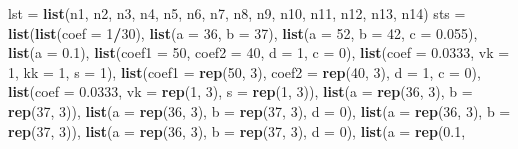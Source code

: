 \documentclass[
]{article}
\newenvironment{Shaded}{\begin{snugshade}}{\end{snugshade}}
\newcommand{\DataTypeTok}[1]{\textcolor[rgb]{0.13,0.29,0.53}{#1}}
\newcommand{\DecValTok}[1]{\textcolor[rgb]{0.00,0.00,0.81}{#1}}
\newcommand{\FloatTok}[1]{\textcolor[rgb]{0.00,0.00,0.81}{#1}}
\newcommand{\KeywordTok}[1]{\textcolor[rgb]{0.13,0.29,0.53}{\textbf{#1}}}
\newcommand{\NormalTok}[1]{#1}
\newcommand{\OperatorTok}[1]{\textcolor[rgb]{0.81,0.36,0.00}{\textbf{#1}}}
\newcommand{\StringTok}[1]{\textcolor[rgb]{0.31,0.60,0.02}{#1}}
\begin{document}
\begin{Shaded}
\begin{Highlighting}[]
{{{\NormalTok{lst =}\StringTok{ }\KeywordTok{list}\NormalTok{(n1, n2, n3, n4, n5, n6, n7, n8, n9, n10, n11, n12, n13, n14)}
\NormalTok{sts =}\StringTok{ }\KeywordTok{list}\NormalTok{(}\KeywordTok{list}\NormalTok{(}\DataTypeTok{coef =} \DecValTok{1}\OperatorTok{/}\DecValTok{30}\NormalTok{), }\KeywordTok{list}\NormalTok{(}\DataTypeTok{a =} \DecValTok{36}\NormalTok{, }\DataTypeTok{b =} \DecValTok{37}\NormalTok{), }\KeywordTok{list}\NormalTok{(}\DataTypeTok{a =} \DecValTok{52}\NormalTok{, }\DataTypeTok{b =} \DecValTok{42}\NormalTok{, }\DataTypeTok{c =} \FloatTok{0.055}\NormalTok{), }
    \KeywordTok{list}\NormalTok{(}\DataTypeTok{a =} \FloatTok{0.1}\NormalTok{), }\KeywordTok{list}\NormalTok{(}\DataTypeTok{coef1 =} \DecValTok{50}\NormalTok{, }\DataTypeTok{coef2 =} \DecValTok{40}\NormalTok{, }\DataTypeTok{d =} \DecValTok{1}\NormalTok{, }\DataTypeTok{c =} \DecValTok{0}\NormalTok{), }\KeywordTok{list}\NormalTok{(}\DataTypeTok{coef =} \FloatTok{0.0333}\NormalTok{, }
        \DataTypeTok{vk =} \DecValTok{1}\NormalTok{, }\DataTypeTok{kk =} \DecValTok{1}\NormalTok{, }\DataTypeTok{s =} \DecValTok{1}\NormalTok{), }\KeywordTok{list}\NormalTok{(}\DataTypeTok{coef1 =} \KeywordTok{rep}\NormalTok{(}\DecValTok{50}\NormalTok{, }\DecValTok{3}\NormalTok{), }\DataTypeTok{coef2 =} \KeywordTok{rep}\NormalTok{(}\DecValTok{40}\NormalTok{, }\DecValTok{3}\NormalTok{), }\DataTypeTok{d =} \DecValTok{1}\NormalTok{, }
        \DataTypeTok{c =} \DecValTok{0}\NormalTok{), }\KeywordTok{list}\NormalTok{(}\DataTypeTok{coef =} \FloatTok{0.0333}\NormalTok{, }\DataTypeTok{vk =} \KeywordTok{rep}\NormalTok{(}\DecValTok{1}\NormalTok{, }\DecValTok{3}\NormalTok{), }\DataTypeTok{s =} \KeywordTok{rep}\NormalTok{(}\DecValTok{1}\NormalTok{, }\DecValTok{3}\NormalTok{)), }\KeywordTok{list}\NormalTok{(}\DataTypeTok{a =} \KeywordTok{rep}\NormalTok{(}\DecValTok{36}\NormalTok{, }
        \DecValTok{3}\NormalTok{), }\DataTypeTok{b =} \KeywordTok{rep}\NormalTok{(}\DecValTok{37}\NormalTok{, }\DecValTok{3}\NormalTok{)), }\KeywordTok{list}\NormalTok{(}\DataTypeTok{a =} \KeywordTok{rep}\NormalTok{(}\DecValTok{36}\NormalTok{, }\DecValTok{3}\NormalTok{), }\DataTypeTok{b =} \KeywordTok{rep}\NormalTok{(}\DecValTok{37}\NormalTok{, }\DecValTok{3}\NormalTok{), }\DataTypeTok{d =} \DecValTok{0}\NormalTok{), }\KeywordTok{list}\NormalTok{(}\DataTypeTok{a =} \KeywordTok{rep}\NormalTok{(}\DecValTok{36}\NormalTok{, }
        \DecValTok{3}\NormalTok{), }\DataTypeTok{b =} \KeywordTok{rep}\NormalTok{(}\DecValTok{37}\NormalTok{, }\DecValTok{3}\NormalTok{)), }\KeywordTok{list}\NormalTok{(}\DataTypeTok{a =} \KeywordTok{rep}\NormalTok{(}\DecValTok{36}\NormalTok{, }\DecValTok{3}\NormalTok{), }\DataTypeTok{b =} \KeywordTok{rep}\NormalTok{(}\DecValTok{37}\NormalTok{, }\DecValTok{3}\NormalTok{), }\DataTypeTok{d =} \DecValTok{0}\NormalTok{), }\KeywordTok{list}\NormalTok{(}\DataTypeTok{a =} \KeywordTok{rep}\NormalTok{(}\FloatTok{0.1}\NormalTok{, }
}}}
\end{Highlighting}
\end{Shaded}
\end{document}

